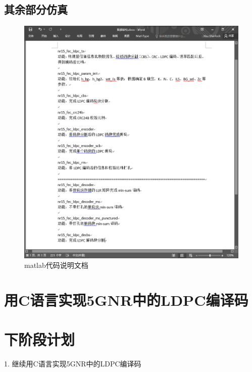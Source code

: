 \documentclass{article}
\begin{document}
\subsection{其余部分仿真}
\begin{figure}[H]
	\centering
	\includegraphics[width = .8\textwidth]{document.png}
	\caption{matlab代码说明文档}
\end{figure}

\section{用C语言实现5GNR中的LDPC编译码}






\section{下阶段计划}
1. 继续用C语言实现5GNR中的LDPC编译码
\end{document}
